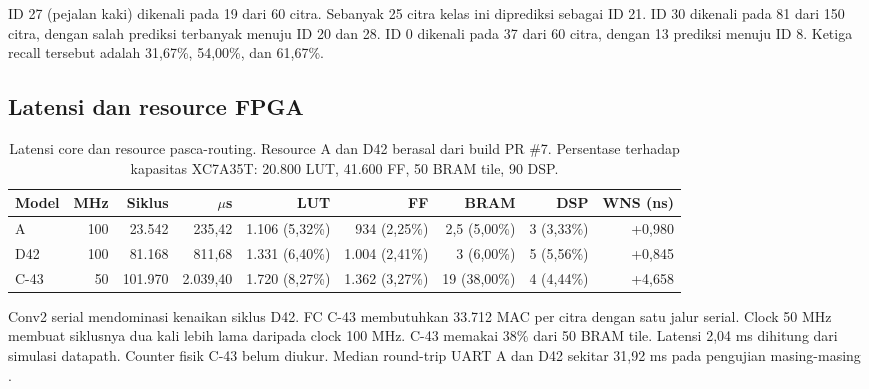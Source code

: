 \documentclass[11pt,a4paper]{article}
\begin{document}
ID 27 (pejalan kaki) dikenali pada 19 dari 60 citra. Sebanyak 25 citra kelas ini
diprediksi sebagai ID 21. ID 30 dikenali pada 81 dari 150 citra,
dengan salah prediksi terbanyak menuju ID 20 dan 28. ID 0 dikenali
pada 37 dari 60 citra, dengan 13 prediksi menuju ID 8. Ketiga recall
tersebut adalah 31,67\%, 54,00\%, dan 61,67\%.

\subsection{Latensi dan resource FPGA}
\begin{table}[H]
\centering\small
\setlength{\tabcolsep}{4pt}
\caption{Latensi core dan resource pasca-routing. Resource A dan D42 berasal dari build PR \#7. Persentase terhadap kapasitas XC7A35T: 20.800 LUT, 41.600 FF, 50 BRAM tile, 90 DSP.}
\begin{tabular}{lrrrrrrrr}
\toprule
Model & MHz & Siklus & $\mu$s & LUT & FF & BRAM & DSP & WNS (ns) \\
\midrule
A & 100 & 23.542 & 235,42 & 1.106 (5,32\%) & 934 (2,25\%) & 2,5 (5,00\%) & 3 (3,33\%) & +0,980 \\
D42 & 100 & 81.168 & 811,68 & 1.331 (6,40\%) & 1.004 (2,41\%) & 3 (6,00\%) & 5 (5,56\%) & +0,845 \\
C-43 & 50 & 101.970 & 2.039,40 & 1.720 (8,27\%) & 1.362 (3,27\%) & 19 (38,00\%) & 4 (4,44\%) & +4,658 \\
\bottomrule
\end{tabular}
\end{table}

Conv2 serial mendominasi kenaikan siklus D42. FC C-43 membutuhkan
33.712 MAC per citra dengan satu jalur serial. Clock 50 MHz membuat
siklusnya dua kali lebih lama daripada clock 100 MHz. C-43 memakai
38\% dari 50 BRAM tile. Latensi 2,04 ms dihitung dari simulasi datapath.
Counter fisik C-43 belum diukur. Median round-trip UART A dan D42
sekitar 31,92 ms pada pengujian masing-masing \cite{repo}.
\end{document}
